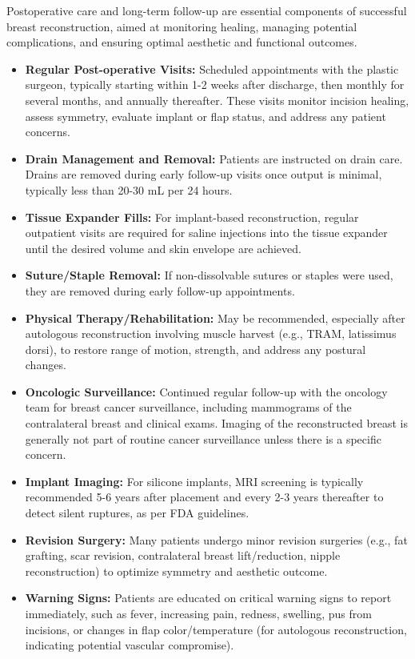 Postoperative care and long-term follow-up are essential components of successful breast reconstruction, aimed at monitoring healing, managing potential complications, and ensuring optimal aesthetic and functional outcomes.

\begin{itemize}
  \item \textbf{Regular Post-operative Visits:} Scheduled appointments with the plastic surgeon, typically starting within 1-2 weeks after discharge, then monthly for several months, and annually thereafter. These visits monitor incision healing, assess symmetry, evaluate implant or flap status, and address any patient concerns.
  \item \textbf{Drain Management and Removal:} Patients are instructed on drain care. Drains are removed during early follow-up visits once output is minimal, typically less than 20-30 mL per 24 hours.
  \item \textbf{Tissue Expander Fills:} For implant-based reconstruction, regular outpatient visits are required for saline injections into the tissue expander until the desired volume and skin envelope are achieved.
  \item \textbf{Suture/Staple Removal:} If non-dissolvable sutures or staples were used, they are removed during early follow-up appointments.
  \item \textbf{Physical Therapy/Rehabilitation:} May be recommended, especially after autologous reconstruction involving muscle harvest (e.g., TRAM, latissimus dorsi), to restore range of motion, strength, and address any postural changes.
  \item \textbf{Oncologic Surveillance:} Continued regular follow-up with the oncology team for breast cancer surveillance, including mammograms of the contralateral breast and clinical exams. Imaging of the reconstructed breast is generally not part of routine cancer surveillance unless there is a specific concern.
  \item \textbf{Implant Imaging:} For silicone implants, MRI screening is typically recommended 5-6 years after placement and every 2-3 years thereafter to detect silent ruptures, as per FDA guidelines.
  \item \textbf{Revision Surgery:} Many patients undergo minor revision surgeries (e.g., fat grafting, scar revision, contralateral breast lift/reduction, nipple reconstruction) to optimize symmetry and aesthetic outcome.
  \item \textbf{Warning Signs:} Patients are educated on critical warning signs to report immediately, such as fever, increasing pain, redness, swelling, pus from incisions, or changes in flap color/temperature (for autologous reconstruction, indicating potential vascular compromise).
\end{itemize}

